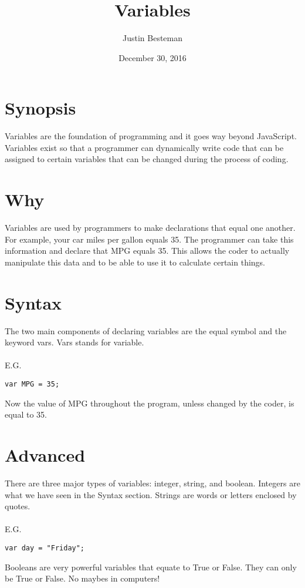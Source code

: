 \documentclass[12pt, letterpaper]{article}
\title{Variables}
\author{Justin Besteman}
\date{December 30, 2016}
\begin{document}
\maketitle


\section*{Synopsis}

	 Variables are the foundation of programming and it goes way beyond JavaScript. Variables exist so that a programmer can dynamically write code that can be assigned to certain variables that can be changed during the process of coding. 

\section*{Why}

Variables are used by programmers to make declarations that equal one another.  For example, your car miles per gallon equals 35. The programmer can take this information and declare that MPG equals 35.  This allows the coder to actually manipulate this data and to be able to use it to calculate certain things. 

\section*{Syntax}

The two main components of declaring variables are the equal symbol and the keyword vars. Vars stands for variable. \\
\\
E.G.
\begin{lstlisting}
var MPG = 35;
\end{lstlisting}
Now the value of MPG throughout the program, unless changed by the coder, is equal to 35.

\section*{Advanced}

There are three major types of variables: integer, string, and boolean. Integers are what we have seen in the Syntax section. Strings are words or letters enclosed by quotes.\\ \\
E.G.
\begin{lstlisting}
var day = "Friday";
\end{lstlisting}
Booleans are very powerful variables that equate to True or False. They can only be True or False. No maybes in computers!
\end{document}
